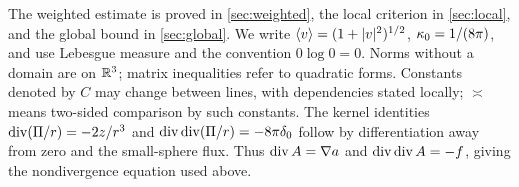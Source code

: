 The weighted estimate is proved in \cref{sec:weighted}, the local criterion in \cref{sec:local}, and the global bound in \cref{sec:global}. We write $\langle v\rangle=(1+|v|^2)^{1/2}$, $\kappa_0=1/(8\pi)$, and use Lebesgue measure and the convention $0\log0=0$. Norms without a domain are on $\mathbb R^3$; matrix inequalities refer to quadratic forms. Constants denoted by $C$ may change between lines, with dependencies stated locally; $\asymp$ means two-sided comparison by such constants. The kernel identities
$\operatorname{div}(\Pi/r)=-2z/r^3$ and $\operatorname{div}\operatorname{div}(\Pi/r)=-8\pi\delta_0$ follow by differentiation away from zero and the small-sphere flux. Thus $\operatorname{div} A=\nabla a$ and $\operatorname{div}\operatorname{div} A=-f$, giving the nondivergence equation used above.
